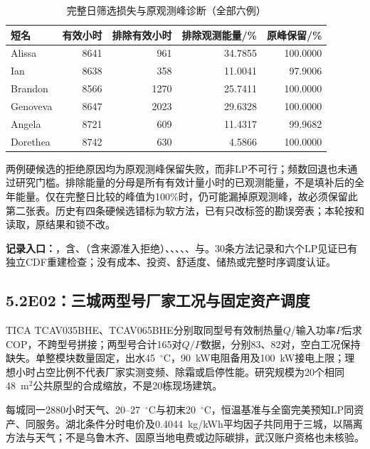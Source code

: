 \begin{table}[H]
\centering
\caption{完整日筛选损失与原观测峰诊断（全部六例）}
\begin{tabularx}{\linewidth}{@{}Yrrrr@{}}
\toprule
短名 & 有效小时 & 排除有效小时 & 排除观测能量/\% & 原峰保留/\%\\\midrule
Alissa & 8641 & 961 & 34.7855 & 100.0000\\
Ian & 8638 & 358 & 11.0041 & 97.9006\\
Brandon & 8566 & 1270 & 25.7411 & 100.0000\\
Genoveva & 8647 & 2023 & 29.6328 & 100.0000\\
Angela & 8721 & 609 & 11.4317 & 99.9682\\
Dorethea & 8742 & 630 & 4.5866 & 100.0000\\
\bottomrule
\end{tabularx}
\end{table}

两例硬候选的拒绝原因均为原观测峰保留失败，而非LP不可行；频数回退也未通过研究门槛。排除能量的分母是所有有效计量小时的已观测能量，不是填补后的全年能量。仅在完整日比较的峰值为100\%时，仍可能漏掉原观测峰，故必须保留此第二张表。历史有四条硬候选错标为软方法，已有只改标签的勘误旁表；本轮按和读取，原结果和锁不改。

\noindent\textbf{记录入口：}，含、（含来源准入拒绝）、、、、、与。30条方法记录和六个LP见证已有独立CDF重建检查；没有成本、投资、舒适度、储热或完整时序调度认证。

\subsection*{5.2\quad E02：三城两型号厂家工况与固定资产调度}
TICA TCAV035BHE、TCAV065BHE分别取同型号有效制热量$Q$/输入功率$P$后求COP，不跨型号拼接；两型号合计165对$Q/P$数据，分别83、82对，空白工况保持缺失。单整模块数量固定，出水45~$^\circ$C，90~kW电阻备用及100~kW接电上限；理想小时占空比例不代表厂家实测变频、除霜或启停性能。研究规模为20个相同48~m$^2$公共原型的合成缩放，不是20栋现场建筑。

每城同一2880小时天气、20--27~$^\circ$C与初末20~$^\circ$C，恒温基准与全窗完美预知LP同资产、同服务。湖北条件分时电价及0.4044~kg/kWh平均因子共同用于三城，以隔离方法与天气；不是乌鲁木齐、固原当地电费或边际碳排，武汉账户资格也未核验。

